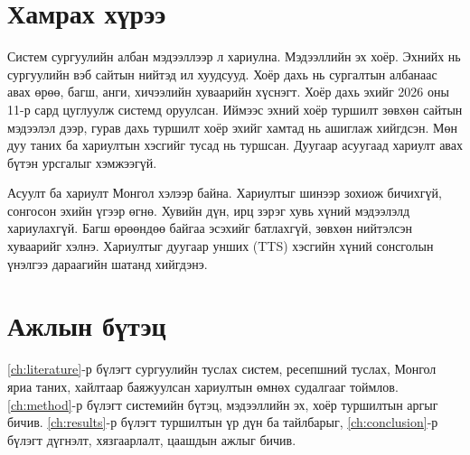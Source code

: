 \section{Хамрах хүрээ}
\label{sec:intro-scope}

Систем сургуулийн албан мэдээллээр л хариулна. Мэдээллийн эх хоёр. Эхнийх нь сургуулийн вэб сайтын нийтэд ил хуудсууд. Хоёр дахь нь сургалтын албанаас авах өрөө, багш, анги, хичээлийн хуваарийн хүснэгт. Хоёр дахь эхийг 2026 оны 11-р сард цуглуулж системд оруулсан. Иймээс эхний хоёр туршилт зөвхөн сайтын мэдээлэл дээр, гурав дахь туршилт хоёр эхийг хамтад нь ашиглаж хийгдсэн. Мөн дуу таних ба хариултын хэсгийг тусад нь туршсан. Дуугаар асуугаад хариулт авах бүтэн урсгалыг хэмжээгүй.

Асуулт ба хариулт Монгол хэлээр байна. Хариултыг шинээр зохиож бичихгүй, сонгосон эхийн үгээр өгнө. Хувийн дүн, ирц зэрэг хувь хүний мэдээлэлд хариулахгүй. Багш өрөөндөө байгаа эсэхийг батлахгүй, зөвхөн нийтэлсэн хуваарийг хэлнэ. Хариултыг дуугаар унших (\ac{TTS}) хэсгийн хүний сонсголын үнэлгээ дараагийн шатанд хийгдэнэ.

\section{Ажлын бүтэц}
\label{sec:intro-structure}

\ref{ch:literature}-р бүлэгт сургуулийн туслах систем, ресепшний туслах, Монгол яриа таних, хайлтаар баяжуулсан хариултын өмнөх судалгааг тоймлов. \ref{ch:method}-р бүлэгт системийн бүтэц, мэдээллийн эх, хоёр туршилтын аргыг бичив. \ref{ch:results}-р бүлэгт туршилтын үр дүн ба тайлбарыг, \ref{ch:conclusion}-р бүлэгт дүгнэлт, хязгаарлалт, цаашдын ажлыг бичив.
